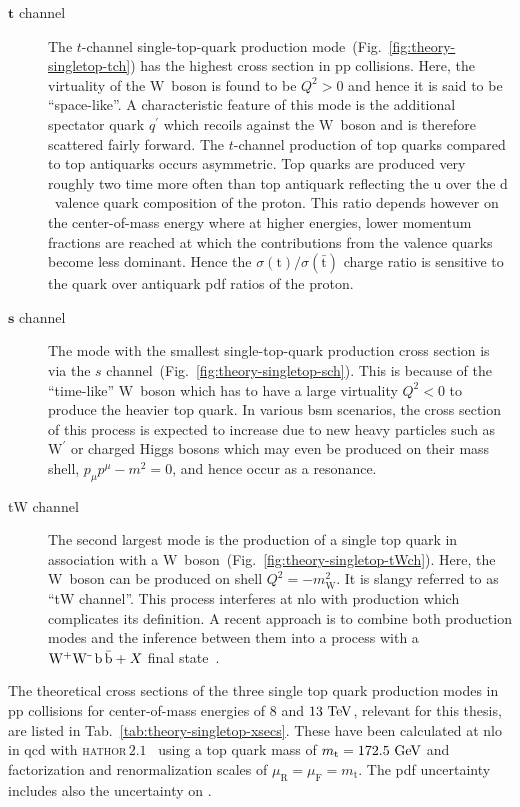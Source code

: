 \begin{description}
\item[$\boldsymbol{t}$ channel] The $t$-channel single-top-quark production mode~(Fig.~\ref{fig:theory-singletop-tch}) has the highest cross section in $\mathrm{pp}$ collisions. Here, the virtuality of the $\mathrm{W}$~boson is found to be $Q^2>0$ and hence it is said to be ``space-like''. A characteristic feature of this mode is the additional spectator quark $q^\prime$ which recoils against the $\mathrm{W}$~boson and is therefore scattered fairly forward. The $t$-channel production of top quarks compared to top antiquarks occurs asymmetric. Top quarks are produced very roughly two time more often than top antiquark reflecting the $\mathrm{u}$ over the $\mathrm{d}$~valence quark composition of the proton. This ratio depends however on the center-of-mass energy where at higher energies, lower momentum fractions are reached at which the contributions from the valence quarks become less dominant. Hence the $\sigma(\mathrm{t})/\sigma(\bar{\mathrm{t}})$ charge ratio is sensitive to the quark over antiquark \gls{pdf} ratios of the proton.
\item[$\boldsymbol{s}$ channel] The mode with the smallest single-top-quark production cross section is via the $s$ channel~(Fig.~\ref{fig:theory-singletop-sch}). This is because of the ``time-like'' $\mathrm{W}$~boson which has to have a large virtuality $Q^2<0$ to produce the heavier top quark. In various \gls{bsm} scenarios, the cross section of this process is expected to increase due to new heavy particles such as $\mathrm{W}^\prime$ or charged Higgs bosons which may even be produced on their mass shell, $p_{\mu}p^{\mu}-m^{2}=0$, and hence occur as a resonance.
\item[tW channel] The second largest mode is the production of a single top quark in association with a $\mathrm{W}$~boson~(Fig.~\ref{fig:theory-singletop-tWch}). Here, the $\mathrm{W}$~boson can be produced on shell $Q^2=-m_\mathrm{W}^{2}$. It is slangy referred to as ``tW channel''. This process interferes at \gls{nlo} with \ttbar production which complicates its definition. A recent approach is to combine both production modes and the inference between them into a process with a $\mathrm{W}^{\rmplus}\mathrm{W}^{\rmminus}\,\mathrm{b}\,\bar{\mathrm{b}}+X$ final state~\cite{Cascioli:2013wga}. 
\end{description}

The theoretical cross sections of the three single top quark production modes in pp collisions for center-of-mass energies of $8$ and $13~\mathrm{TeV}$, relevant for this thesis, are listed in Tab.~\ref{tab:theory-singletop-xsecs}. These have been calculated at \gls{nlo} in \gls{qcd} with \textsc{\gls{hathor}}\,$2.1$~\cite{Aliev:2010zk,Kant:2014oha} using a top quark mass of $m_\mathrm{t}=172.5~\mathrm{GeV}$ and factorization and renormalization scales of $\mu_\mathrm{R}=\mu_\mathrm{F}=m_\mathrm{t}$. The \gls{pdf} uncertainty includes also the uncertainty on \as.

